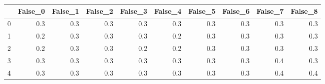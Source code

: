 \begin{tabular}{lrrrrrrrrr}
\toprule
{} &  False\_0 &  False\_1 &  False\_2 &  False\_3 &  False\_4 &  False\_5 &  False\_6 &  False\_7 &  False\_8 \\ \hline
\midrule
0 &      0.3 &      0.3 &      0.3 &      0.3 &      0.3 &      0.3 &      0.3 &      0.3 &      0.3 \\ \hline
1 &      0.2 &      0.3 &      0.3 &      0.3 &      0.2 &      0.3 &      0.3 &      0.3 &      0.3 \\ \hline
2 &      0.2 &      0.3 &      0.3 &      0.2 &      0.2 &      0.3 &      0.3 &      0.3 &      0.3 \\ \hline
3 &      0.3 &      0.3 &      0.3 &      0.3 &      0.3 &      0.3 &      0.3 &      0.4 &      0.3 \\ \hline
4 &      0.3 &      0.3 &      0.3 &      0.3 &      0.3 &      0.3 &      0.3 &      0.4 &      0.4 \\ \hline
\bottomrule
\end{tabular}
